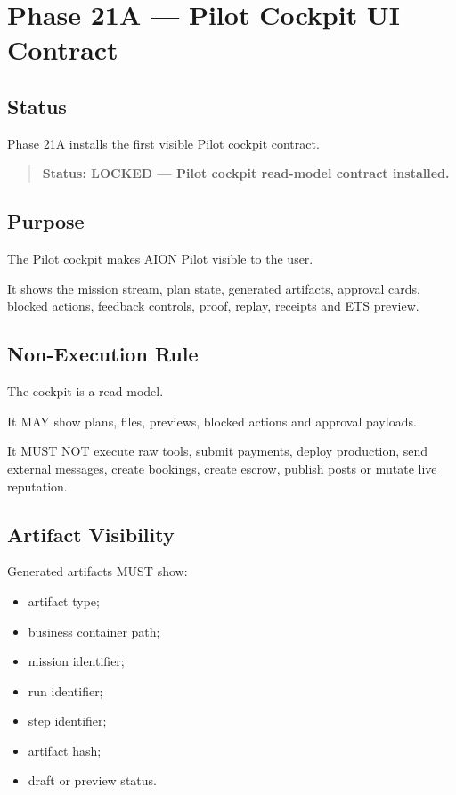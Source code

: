 \section{Phase 21A --- Pilot Cockpit UI Contract}
\label{sec:aion-phase21a-pilot-cockpit-ui-contract}

\subsection{Status}

Phase 21A installs the first visible Pilot cockpit contract.

\begin{quote}
\textbf{Status: LOCKED --- Pilot cockpit read-model contract installed.}
\end{quote}

\subsection{Purpose}

The Pilot cockpit makes AION Pilot visible to the user.

It shows the mission stream, plan state, generated artifacts, approval cards, blocked actions, feedback controls, proof, replay, receipts and ETS preview.

\subsection{Non-Execution Rule}

The cockpit is a read model.

It MAY show plans, files, previews, blocked actions and approval payloads.

It MUST NOT execute raw tools, submit payments, deploy production, send external messages, create bookings, create escrow, publish posts or mutate live reputation.

\subsection{Artifact Visibility}

Generated artifacts MUST show:

\begin{itemize}
  \item artifact type;
  \item business container path;
  \item mission identifier;
  \item run identifier;
  \item step identifier;
  \item artifact hash;
  \item draft or preview status.
\end{itemize}

